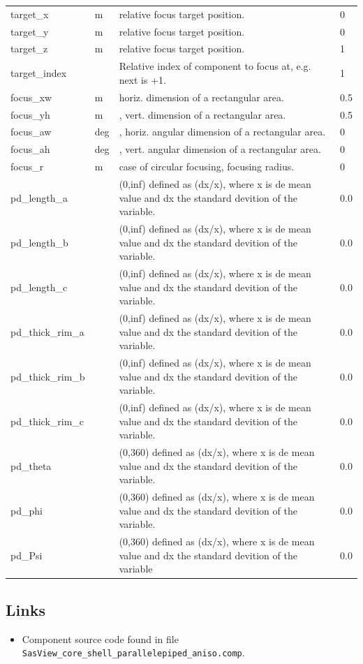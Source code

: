 \begin{longtable}{p{}p{}p{}p{}}
target\_x & m & relative focus target position. & 0 \\
target\_y & m & relative focus target position. & 0 \\
target\_z & m & relative focus target position. & 1 \\
target\_index &   & Relative index of component to focus at, e.g. next is +1. & 1 \\
focus\_xw & m & horiz. dimension of a rectangular area. & 0.5 \\
focus\_yh & m & , vert. dimension of a rectangular area. & 0.5 \\
focus\_aw & deg & , horiz. angular dimension of a rectangular area. & 0 \\
focus\_ah & deg & , vert. angular dimension of a rectangular area. & 0 \\
focus\_r & m & case of circular focusing, focusing radius. & 0 \\
pd\_length\_a &  & (0,inf) defined as (dx/x), where x is de mean value and dx the standard devition of the variable. & 0.0 \\
pd\_length\_b &  & (0,inf) defined as (dx/x), where x is de mean value and dx the standard devition of the variable. & 0.0 \\
pd\_length\_c &  & (0,inf) defined as (dx/x), where x is de mean value and dx the standard devition of the variable. & 0.0 \\
pd\_thick\_rim\_a &  & (0,inf) defined as (dx/x), where x is de mean value and dx the standard devition of the variable. & 0.0 \\
pd\_thick\_rim\_b &  & (0,inf) defined as (dx/x), where x is de mean value and dx the standard devition of the variable. & 0.0 \\
pd\_thick\_rim\_c &  & (0,inf) defined as (dx/x), where x is de mean value and dx the standard devition of the variable. & 0.0 \\
pd\_theta &  & (0,360) defined as (dx/x), where x is de mean value and dx the standard devition of the variable. & 0.0 \\
pd\_phi &  & (0,360) defined as (dx/x), where x is de mean value and dx the standard devition of the variable. & 0.0 \\
pd\_Psi &  & (0,360) defined as (dx/x), where x is de mean value and dx the standard devition of the variable & 0.0 \\
\bottomrule
\end{longtable}

\subsection*{Links}
\begin{itemize}
  \item Component source code found in file \texttt{SasView\_core\_shell\_parallelepiped\_aniso.comp}.
\end{itemize}
